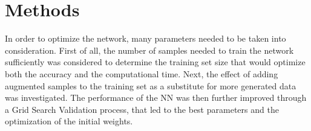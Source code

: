 \documentclass[prl,twocolumn]{revtex4-1}
\begin{document}

\section{Methods}
In order to optimize the network, many parameters needed to be taken into consideration. First of all, the number of samples needed to train the network sufficiently was considered to determine the training set size that would optimize both the accuracy and the computational time. Next, the effect of adding augmented samples to the training set as a substitute for more generated data was investigated. The performance of the NN was then further improved through a Grid Search Validation process, that led to the best parameters and the optimization of the initial weights.

\end{document}
